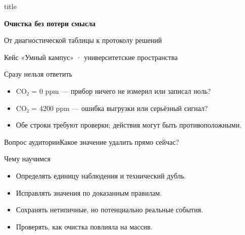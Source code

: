 \documentclass[aspectratio=169,10pt]{beamer}
\begin{document}
\begin{frame}[plain]
\begin{beamercolorbox}[wd=\paperwidth,ht=\paperheight,sep=1.4cm,center]{title}
\vspace*{1.0cm}{\large Данные как основа ИИ · семестр 2}\par\vspace{1cm}
{\fontsize{30}{38}\selectfont\bfseries Очистка без потери смысла}\par\vspace{0.6cm}
{\large От диагностической таблицы к протоколу решений}\par\vfill{\small Кейс «Умный кампус» · университетские пространства}
\end{beamercolorbox}\end{frame}
\begin{frame}[t]{Сразу нельзя ответить}
\begin{itemize}
\item CO₂ = 0 ppm — прибор ничего не измерил или записал ноль?
\vspace{4pt}
\item CO₂ = 4200 ppm — ошибка выгрузки или серьёзный сигнал?
\vspace{4pt}
\item Обе строки требуют проверки; действия могут быть противоположными.
\vspace{4pt}
\end{itemize}
\vfill\begin{alertblock}{Вопрос аудитории}Какое значение удалить прямо сейчас?\end{alertblock}
\end{frame}
\begin{frame}[t]{Чему научимся}
\begin{itemize}
\item Определять единицу наблюдения и технический дубль.
\vspace{4pt}
\item Исправлять значения по доказанным правилам.
\vspace{4pt}
\item Сохранять нетипичные, но потенциально реальные события.
\vspace{4pt}
\item Проверять, как очистка повлияла на массив.
\vspace{4pt}
\end{itemize}
\end{frame}
\end{document}
